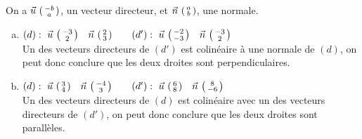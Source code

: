 \documentclass[12pt, a4paper]{article}
\begin{document}
	\begin{Exercise}[number={52}]
		On a $\vec{u}\ \begin{psmallmatrix}-b \\ a\end{psmallmatrix}$, un vecteur directeur, et $\vec{n}\ \begin{psmallmatrix}a \\ b\end{psmallmatrix}$, une normale.
		\begin{enumerate}[a)]
		   \item	$(d):\ \vec{u}\ \begin{psmallmatrix}-3 \\ 2\end{psmallmatrix} \quad \vec{n}\ \begin{psmallmatrix}2 \\ 3\end{psmallmatrix} \qquad (d'):\ \vec{u}\ \begin{psmallmatrix}-2 \\ -3\end{psmallmatrix} \quad \vec{n}\ \begin{psmallmatrix}-3 \\ 2\end{psmallmatrix}$ \\ Un des vecteurs directeurs de $(d')$ est colinéaire à une normale de $(d)$, on peut donc conclure que les deux droites sont perpendiculaires.
		   \item	$(d):\ \vec{u}\ \begin{psmallmatrix}3 \\ 4\end{psmallmatrix} \quad \vec{n}\ \begin{psmallmatrix}-4 \\ 3\end{psmallmatrix} \qquad (d'):\ \vec{u}\ \begin{psmallmatrix}6 \\ 8\end{psmallmatrix} \quad \vec{n}\ \begin{psmallmatrix}8 \\ -6\end{psmallmatrix}$ \\ Un des vecteurs directeurs de $(d)$ est colinéaire avec un des vecteurs directeurs de $(d')$, on peut donc conclure que les deux droites sont parallèles.
		   \end{enumerate}	
	\end{Exercise}
\end{document}
